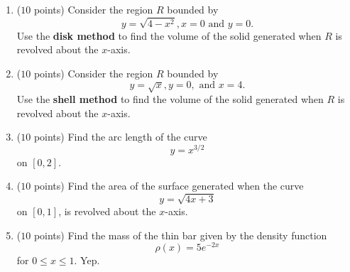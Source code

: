\documentclass{article}
\begin{document}
\normalsize


\vfill

\newpage

\begin{enumerate}

\item ($10$ points) Consider the region $R$ bounded by
$$y = \sqrt{4 - x^{2}}, x = 0 \text{ and } y = 0.  $$
Use the {\bfseries disk method} to find the volume of the solid generated when $R$ is revolved about the $x$-axis.
\newpage

\item ($10$ points) Consider the region $R$ bounded by
$$y = \sqrt{x}, y= 0, \text{ and }x=4.$$
Use the {\bfseries shell method} to find the volume of the solid generated when $R$ is revolved about the $x$-axis.
\newpage
\item ($10$ points) Find the arc length of the curve
$$y = x^{3/2} $$
on $[0,2]$.

\newpage
\item ($10$ points) Find the area of the surface generated when the curve
$$y = \sqrt{4x + 3} $$
on $[0,1]$, is revolved about the $x$-axis.
\newpage
\item ($10$ points) Find the mass of the thin bar given by the density function
$$\rho(x) = 5 e^{-2x} $$
for $0 \le x \le 1$. Yep.

\end{enumerate}
\end{document}
